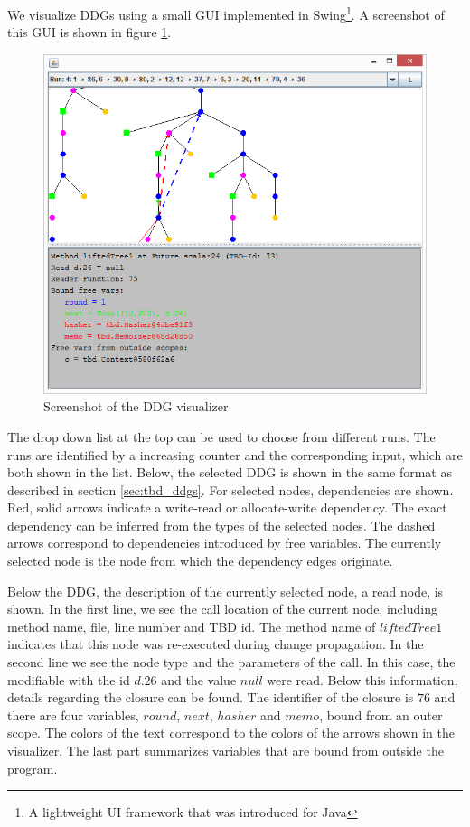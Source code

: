 We visualize DDGs using a small GUI implemented in Swing\footnote{A lightweight UI framework that was introduced for Java}. A screenshot of this GUI is shown in figure \ref{fig:ddg_vis_ui}. 

\begin{figure}
\begin{center}
\includegraphics[scale=0.7]{screens/DDGVis.png}
\end{center}
\caption{Screenshot of the DDG visualizer}
\label{fig:ddg_vis_ui}
\end{figure}

The drop down list at the top can be used to choose from different runs. The runs are identified by a increasing counter and the corresponding input, which are both shown in the list. Below, the selected DDG is shown in the same format as described in section \ref{sec:tbd_ddgs}. For selected nodes, dependencies are shown. Red, solid arrows indicate a write-read or allocate-write dependency. The exact dependency can be inferred from the types of the selected nodes. The dashed arrows correspond to dependencies introduced by free variables. The currently selected node is the node from which the dependency edges originate. 

Below the DDG, the description of the currently selected node, a read node, is shown. In the first line, we see the call location of the current node, including method name, file, line number and TBD id. The method name of $liftedTree1$ indicates that this node was re-executed during change propagation. In the second line we see the node type and the parameters of the call. In this case, the modifiable with the id $d.26$ and the value $null$ were read. Below this information, details regarding the closure can be found. The identifier of the closure is $76$ and there are four variables, $round$, $next$, $hasher$ and $memo$, bound from an outer scope. The colors of the text correspond to the colors of the arrows shown in the visualizer. The last part summarizes variables that are bound from outside the program.  

